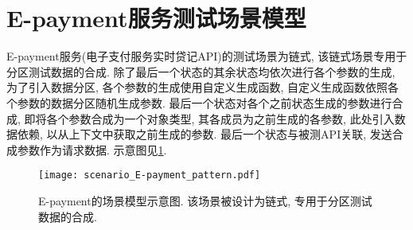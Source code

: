     \section{E-payment服务测试场景模型}
        \label{sec:epayment_scenario_model}
    
        E-payment服务(电子支付服务实时贷记API)的测试场景为链式, 该链式场景专用于分区测试数据的合成. 除了最后一个状态的其余状态均依次进行各个参数的生成, 为了引入数据分区, 各个参数的生成使用自定义生成函数, 自定义生成函数依照各个参数的数据分区随机生成参数. 最后一个状态对各个之前状态生成的参数进行合成, 即将各个参数合成为一个对象类型, 其各成员为之前生成的各参数, 此处引入数据依赖, 以从上下文中获取之前生成的参数. 最后一个状态与被测API关联, 发送合成参数作为请求数据. 示意图见\ref{fig:epayment_scenario}.
        
        \begin{figure}[!htb]
            \centering
            \texttt{[image: scenario\_E-payment\_pattern.pdf]}
            \caption{E-payment的场景模型示意图. 该场景被设计为链式, 专用于分区测试数据的合成.}
            \label{fig:epayment_scenario}
        \end{figure}
        